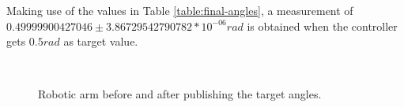 \documentclass[12pt,oneside]{article}
\begin{document}
Making use of the values in Table \ref{table:final-angles}, a measurement of \\
$0.49999900427046 \pm 3.86729542790782 * 10^{-06} rad$ is obtained when the controller gets $0.5 rad$ as target value.
\begin{figure}[H]
  \centering
  \\
  \caption{Robotic arm before and after publishing the target angles.}
\end{figure}
\end{document}

